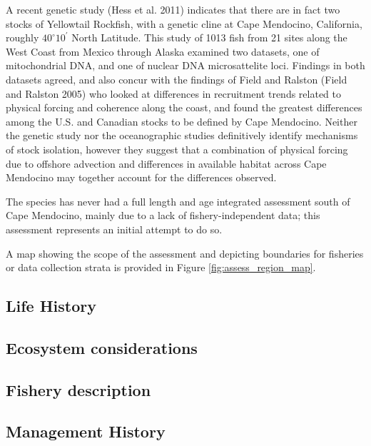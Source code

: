 \documentclass[
]{scrartcl}
\begin{document}
A recent genetic study (Hess et al. 2011) indicates that there are in
fact two stocks of Yellowtail Rockfish, with a genetic cline at Cape
Mendocino, California, roughly \(40^\circ 10^\prime\) North Latitude.
This study of 1013 fish from 21 sites along the West Coast from Mexico
through Alaska examined two datasets, one of mitochondrial DNA, and one
of nuclear DNA microsattelite loci. Findings in both datasets agreed,
and also concur with the findings of Field and Ralston (Field and
Ralston 2005) who looked at differences in recruitment trends related to
physical forcing and coherence along the coast, and found the greatest
differences among the U.S. and Canadian stocks to be defined by Cape
Mendocino. Neither the genetic study nor the oceanographic studies
definitively identify mechanisms of stock isolation, however they
suggest that a combination of physical forcing due to offshore advection
and differences in available habitat across Cape Mendocino may together
account for the differences observed.

The species has never had a full length and age integrated assessment
south of Cape Mendocino, mainly due to a lack of fishery-independent
data; this assessment represents an initial attempt to do so.

A map showing the scope of the assessment and depicting boundaries for
fisheries or data collection strata is provided in Figure
\ref{fig:assess_region_map}.

\hypertarget{life-history}{%
\subsection{Life History}\label{life-history}}

\hypertarget{ecosystem-considerations-1}{%
\subsection{Ecosystem considerations}\label{ecosystem-considerations-1}}

\hypertarget{fishery-description}{%
\subsection{Fishery description}\label{fishery-description}}

\hypertarget{management-history}{%
\subsection{Management History}\label{management-history}}
\end{document}
